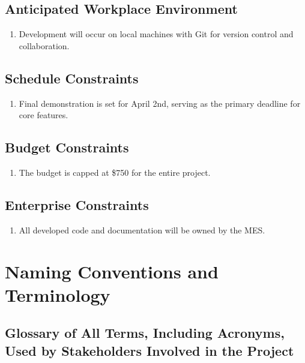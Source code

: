 \documentclass[12pt]{article}
\begin{document}
\subsection{Anticipated Workplace Environment}
\begin{enumerate}
  \item Development will occur on local machines with Git for version control and collaboration.
\end{enumerate}

\subsection{Schedule Constraints}
\begin{enumerate}
  \item Final demonstration is set for April 2nd, serving as the primary deadline for core features.
\end{enumerate}

\subsection{Budget Constraints}
\begin{enumerate}
  \item The budget is capped at \$750 for the entire project.
\end{enumerate}

\subsection{Enterprise Constraints}
\begin{enumerate}
  \item All developed code and documentation will be owned by the MES.
\end{enumerate}

\section{Naming Conventions and Terminology}
\subsection{Glossary of All Terms, Including Acronyms, Used by Stakeholders Involved in the Project}
\end{document}
